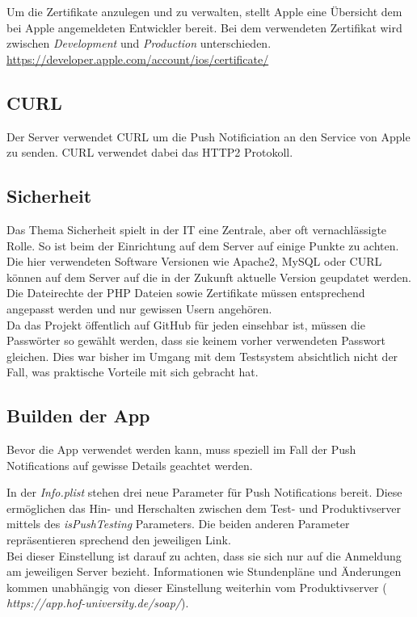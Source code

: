 Um die Zertifikate anzulegen und zu verwalten, stellt Apple eine Übersicht dem bei Apple angemeldeten Entwickler bereit. Bei dem verwendeten Zertifikat wird zwischen \textit{Development} und \textit{Production} unterschieden.\\
\url{https://developer.apple.com/account/ios/certificate/}


\subsection{CURL}
Der Server verwendet CURL um die Push Notificiation an den Service von Apple zu senden.  
CURL verwendet dabei das HTTP2 Protokoll.

\textcolor{black}{

}


\subsection{Sicherheit}
Das Thema Sicherheit spielt in der IT eine Zentrale, aber oft vernachlässigte Rolle. So ist beim der Einrichtung auf dem Server auf einige Punkte zu achten. Die hier verwendeten Software Versionen wie Apache2, MySQL oder CURL können auf dem Server auf die in der Zukunft aktuelle Version geupdatet werden.
Die Dateirechte der PHP Dateien sowie Zertifikate müssen entsprechend angepasst werden und nur gewissen Usern angehören.\\
Da das Projekt öffentlich auf GitHub für jeden einsehbar ist, müssen die Passwörter so gewählt werden, dass sie keinem vorher verwendeten Passwort gleichen. Dies war bisher im Umgang mit dem Testsystem absichtlich nicht der Fall, was praktische Vorteile mit sich gebracht hat.

\newpage

\subsection{Builden der App}
Bevor die App verwendet werden kann, muss speziell im Fall der Push Notifications auf gewisse Details geachtet werden.


In der \textit{Info.plist} stehen drei neue Parameter für Push Notifications bereit. Diese ermöglichen das Hin- und Herschalten zwischen dem Test- und Produktivserver mittels des \textit{isPushTesting} Parameters. Die beiden anderen Parameter repräsentieren sprechend den jeweiligen Link.\\
Bei dieser Einstellung ist darauf zu achten, dass sie sich nur auf die Anmeldung am jeweiligen Server bezieht. Informationen wie Stundenpläne und Änderungen kommen unabhängig von dieser Einstellung weiterhin vom Produktivserver (\textit{ https://app.hof-university.de/soap/}).

